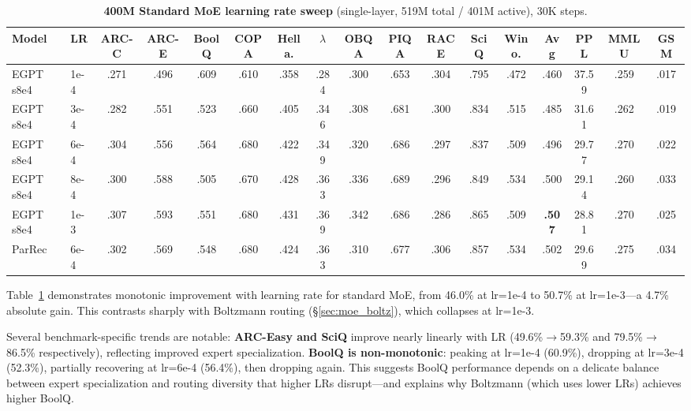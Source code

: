 \documentclass[oneside]{article}
\begin{document}
\begin{table}[t]
\centering
\caption{\textbf{400M Standard MoE learning rate sweep} (single-layer, 519M total / 401M active), 30K steps.}
\label{tab:moe_400m_lr}
\begin{adjustbox}{max width=\textwidth}
\begin{tabular}{l|l|ccccccccccc|c|c|cc}
\toprule
\textbf{Model} & \textbf{LR} & \textbf{ARC-C} & \textbf{ARC-E} & \textbf{BoolQ} & \textbf{COPA} & \textbf{Hella.} & \textbf{$\lambda$} & \textbf{OBQA} & \textbf{PIQA} & \textbf{RACE} & \textbf{SciQ} & \textbf{Wino.} & \textbf{Avg} & \textbf{PPL} & \textbf{MMLU} & \textbf{GSM} \\
\midrule
EGPT s8e4  & 1e-4 & .271 & .496 & .609 & .610 & .358 & .284 & .300 & .653 & .304 & .795 & .472 & .460 & 37.59 & .259 & .017 \\
EGPT s8e4  & 3e-4 & .282 & .551 & .523 & .660 & .405 & .346 & .308 & .681 & .300 & .834 & .515 & .485 & 31.61 & .262 & .019 \\
EGPT s8e4  & 6e-4 & .304 & .556 & .564 & .680 & .422 & .349 & .320 & .686 & .297 & .837 & .509 & .496 & 29.77 & .270 & .022 \\
EGPT s8e4  & 8e-4 & .300 & .588 & .505 & .670 & .428 & .363 & .336 & .689 & .296 & .849 & .534 & .500 & 29.14 & .260 & .033 \\
EGPT s8e4  & 1e-3 & .307 & .593 & .551 & .680 & .431 & .369 & .342 & .686 & .286 & .865 & .509 & \textbf{.507} & 28.81 & .270 & .025 \\
\midrule
ParRec     & 6e-4 & .302 & .569 & .548 & .680 & .424 & .363 & .310 & .677 & .306 & .857 & .534 & .502 & 29.69 & .275 & .034 \\
\bottomrule
\end{tabular}
\end{adjustbox}
\end{table}

Table~\ref{tab:moe_400m_lr} demonstrates monotonic improvement with learning rate for standard MoE, from 46.0\% at lr=1e-4 to 50.7\% at lr=1e-3---a 4.7\% absolute gain. This contrasts sharply with Boltzmann routing (\S\ref{sec:moe_boltz}), which collapses at lr=1e-3.

Several benchmark-specific trends are notable: \textbf{ARC-Easy and SciQ} improve nearly linearly with LR (49.6\%$\to$59.3\% and 79.5\%$\to$86.5\% respectively), reflecting improved expert specialization. \textbf{BoolQ is non-monotonic}: peaking at lr=1e-4 (60.9\%), dropping at lr=3e-4 (52.3\%), partially recovering at lr=6e-4 (56.4\%), then dropping again. This suggests BoolQ performance depends on a delicate balance between expert specialization and routing diversity that higher LRs disrupt---and explains why Boltzmann (which uses lower LRs) achieves higher BoolQ.
\end{document}
